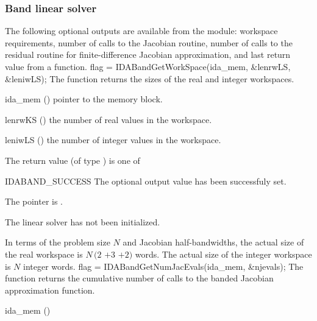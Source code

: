 {\subsubsection{Band linear solver}\label{sss:optout_band}
The following optional outputs are available from the {\idaband} module:
workspace requirements, number of calls to the Jacobian routine, number of 
calls to the residual routine for finite-difference Jacobian approximation,
and last return value from a {\idaband} function.
{
  flag = IDABandGetWorkSpace(ida\_mem, \&lenrwLS, \&leniwLS);
}
{
  The function  returns the sizes of
  the {\idaband} real and integer workspaces.
}
{
  \begin{args}
  \item[ida\_mem] ()
    pointer to the {\ida} memory block.
  \item[lenrwKS] ()
    the number of real values in the {\idaband} workspace.
  \item[leniwLS] ()
    the number of integer values in the {\idaband} workspace.
  \end{args}
}
{
  The return value  (of type ) is one of
  \begin{args}
  \item[IDABAND\_SUCCESS] 
    The optional output value has been successfuly set.
  \item[\Id{IDABAND\_MEM\_NULL}]
    The  pointer is .
  \item[\Id{IDABAND\_LMEM\_NULL}]
    The {\idaband} linear solver has not been initialized.
  \end{args}
}
{
  In terms of the problem size $N$ and Jacobian half-bandwidths, 
  the actual size of the real workspace is
  $N\,(2$ $+ 3$  $+ 2)$  words.
  The actual size of the integer workspace is $N$ integer words.
}
{
  flag = IDABandGetNumJacEvals(ida\_mem, \&njevals);
}
{
  The function  returns the
  cumulative number of calls to the banded Jacobian approximation function.
}
{
  \begin{args}[njevals]
  \item[ida\_mem] ()

\end{args}}}

